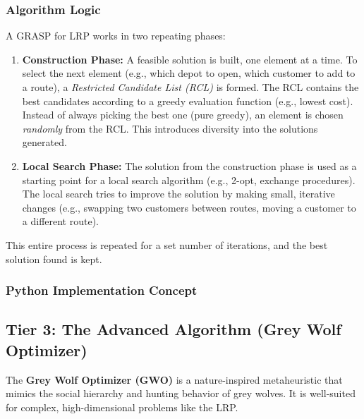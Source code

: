 \documentclass{article}
\begin{document}
\subsubsection{Algorithm Logic}
A GRASP for LRP works in two repeating phases:
\begin{enumerate}
    \item \textbf{Construction Phase:} A feasible solution is built, one element at a time. To select the next element (e.g., which depot to open, which customer to add to a route), a \textit{Restricted Candidate List (RCL)} is formed. The RCL contains the best candidates according to a greedy evaluation function (e.g., lowest cost). Instead of always picking the best one (pure greedy), an element is chosen \textit{randomly} from the RCL. This introduces diversity into the solutions generated.
    \item \textbf{Local Search Phase:} The solution from the construction phase is used as a starting point for a local search algorithm (e.g., 2-opt, exchange procedures). The local search tries to improve the solution by making small, iterative changes (e.g., swapping two customers between routes, moving a customer to a different route).
\end{enumerate}
This entire process is repeated for a set number of iterations, and the best solution found is kept.

\subsubsection{Python Implementation Concept}


\subsection{Tier 3: The Advanced Algorithm (Grey Wolf Optimizer)}
The \textbf{Grey Wolf Optimizer (GWO)} is a nature-inspired metaheuristic that mimics the social hierarchy and hunting behavior of grey wolves. It is well-suited for complex, high-dimensional problems like the LRP.
\end{document}
